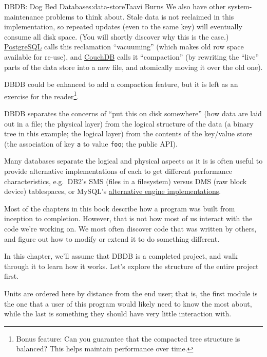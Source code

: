 \begin{aosachapter}{DBDB: Dog Bed Database}{s:data-store}{Taavi Burns}
We also have other system-maintenance problems to think about. Stale
data is not reclaimed in this implementation, so repeated updates (even
to the same key) will eventually consume all disk space. (You will
shortly discover why this is the case.)
\href{http://www.postgresql.org/}{PostgreSQL} calls this reclamation
``vacuuming'' (which makes old row space available for re-use), and
\href{http://couchdb.apache.org/}{CouchDB} calls it ``compaction'' (by
rewriting the ``live'' parts of the data store into a new file, and
atomically moving it over the old one).

DBDB could be enhanced to add a compaction feature, but it is left as an
exercise for the reader\footnote{Bonus feature: Can you guarantee that
  the compacted tree structure is balanced? This helps maintain
  performance over time.}.

\label{the-architecture-of-dbdb}

DBDB separates the concerns of ``put this on disk somewhere'' (how data
are laid out in a file; the physical layer) from the logical structure
of the data (a binary tree in this example; the logical layer) from the
contents of the key/value store (the association of key \texttt{a} to
value \texttt{foo}; the public API).

Many databases separate the logical and physical aspects as it is is
often useful to provide alternative implementations of each to get
different performance characteristics, e.g.~DB2's SMS (files in a
filesystem) versus DMS (raw block device) tablespaces, or MySQL's
\href{http://dev.mysql.com/doc/refman/5.7/en/storage-engines.html}{alternative
engine implementations}.

\label{discovering-the-design}

Most of the chapters in this book describe how a program was built from
inception to completion. However, that is not how most of us interact
with the code we're working on. We most often discover code that was
written by others, and figure out how to modify or extend it to do
something different.

In this chapter, we'll assume that DBDB is a completed project, and walk
through it to learn how it works. Let's explore the structure of the
entire project first.

\label{organisational-units}

Units are ordered here by distance from the end user; that is, the first
module is the one that a user of this program would likely need to know
the most about, while the last is something they should have very little
interaction with.


\end{aosachapter}
